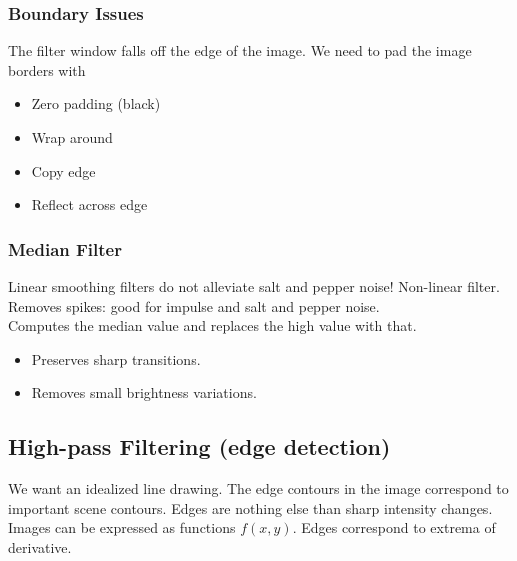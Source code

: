 \documentclass[a4paper,12 pt]{article}
\theoremstyle{definition}
\theoremstyle{remark}
\theoremstyle{definition}
\theoremstyle{definition}
\theoremstyle{definition}
\theoremstyle{remark}
\theoremstyle{definition}
\begin{document}
\subsubsection*{Boundary Issues}
The filter window falls off the edge of the image. We need to pad the image borders with
\begin{itemize}
\item Zero padding (black)
\item Wrap around
\item Copy edge
\item Reflect across edge
\end{itemize}
\subsubsection*{Median Filter}
Linear smoothing filters do not alleviate salt and pepper noise! Non-linear filter. Removes spikes: good for impulse and salt and pepper noise. \\
Computes the median value and replaces the high value with that. 
\begin{itemize}
\item Preserves sharp transitions.
\item Removes small brightness variations.
\end{itemize}
\subsection*{High-pass Filtering (edge detection)}
We want an idealized line drawing. The edge contours in the image correspond to important scene contours. Edges are nothing else than sharp intensity changes. Images can be expressed as functions $f(x,y)$. Edges correspond to extrema of derivative.
\end{document}
